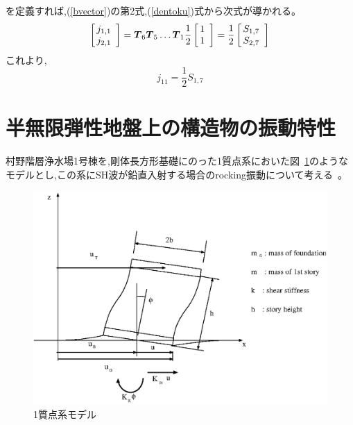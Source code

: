 \documentclass[titlepage]{jsarticle}
\def\dfrac#1#2{{\displaystyle\frac{#1}{#2}}}
\def\Matrix#1{{\mbox{\boldmath $#1$}}}
\begin{document}
を定義すれば,(\ref{bvector})の第2式,(\ref{dentoku})式から次式が導かれる。
\begin{equation}
\left[ \begin{array}{@{\,}c}
j_{1,1} \\
j_{2,1} \end{array} \right] = 
\Matrix{T} _6 \Matrix{T} _5 \ldots \Matrix{T} _1 \dfrac{1}{2}
\left[ \begin{array}{@{\,}c}
1 \\
1 \end{array} \right] = \dfrac{1}{2}
\left[ \begin{array}{@{\,}c}
S_{1,7} \\
S_{2,7} \end{array} \right] \label{jvector}
\end{equation}
これより,
\begin{equation}
j_{11} = \dfrac{1}{2} S_{1,7} \label{j11}
\end{equation}

\section{半無限弾性地盤上の構造物の振動特性}\label{kouzou}
村野階層浄水場1号棟を,剛体長方形基礎にのった1質点系においた図~\ref{sdof}のような
モデルとし,この系にSH波が鉛直入射する場合のrocking振動について考える~\cite{9}。

\begin{figure}[p]
\begin{center}
\includegraphics[scale=1.0]{sdof.eps}
\caption{1質点系モデル}
\label{sdof}
\end{center}
\end{figure}
\end{document}
